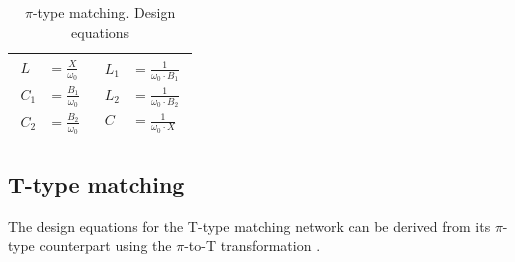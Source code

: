 \begin{table}[H]
\begin{tabular}{ | c | c | }
\begin{minipage}{.4\textwidth}
{\begin{align}
           L &= \frac{X}{\omega_0}\\
           C_1 &= \frac{B_1}{\omega_0}\\
           C_2 &= \frac{B_2}{\omega_0}
         \end{align}}
    \end{minipage}
    &
        \begin{minipage}{.4\textwidth}
         {\begin{align}
           L_1 &= \frac{1}{\omega_0 \cdot B_1}\\
           L_2 &= \frac{1}{\omega_0 \cdot B_2}\\
           C   &= \frac{1}{\omega_0 \cdot X}
         \end{align}}
    \end{minipage}
    \\ \hline
  \end{tabular}
  \caption{$\pi$-type matching. Design equations}
  \label{tbl:pi-type-matching}
\end{table}

\subsection{T-type matching}

\noindent The design equations for the T-type matching network can be derived from its $\pi$-type counterpart using the $\pi$-to-T transformation \cite{ElectricalCommunicationAAlbert}.

